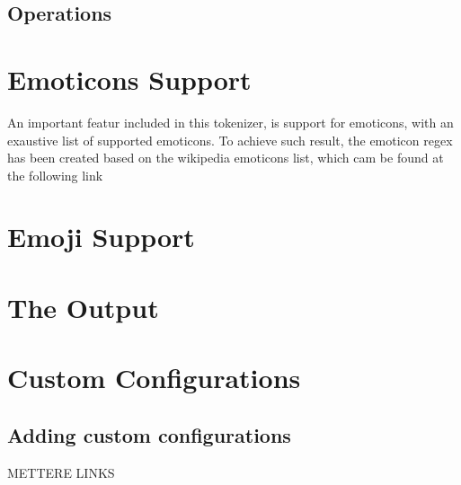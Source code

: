 \documentclass[12pt,a4paper]{report}
\begin{document}
\section{Operations}

\chapter{Emoticons Support}
An important featur included in this tokenizer, is support for emoticons, with an exaustive list of supported emoticons. To achieve such result, the emoticon regex has been created based on the wikipedia emoticons list, which cam be found at the following link
\section{}

\chapter{Emoji Support}
\section{}

\chapter{The Output}
\section{}

\chapter{Custom Configurations}
\section{Adding custom configurations}



METTERE LINKS
\end{document}
